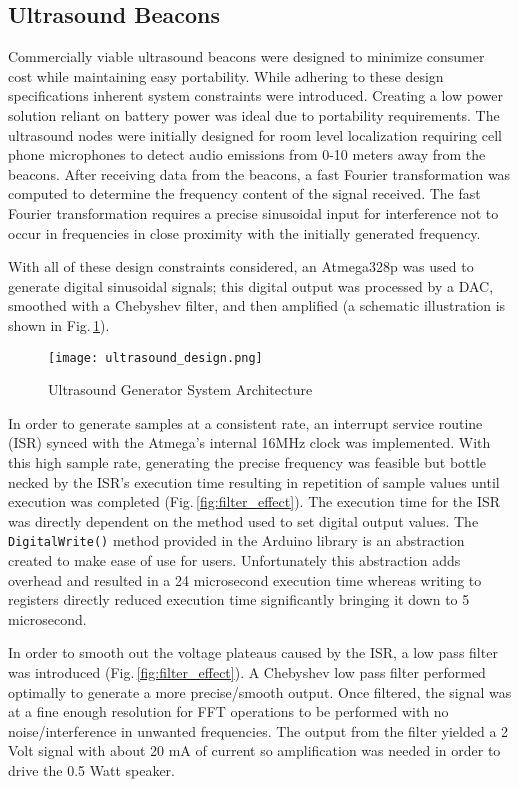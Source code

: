 \subsection{Ultrasound Beacons}
\label{sec:ultrasound-beacons}


Commercially viable ultrasound beacons were designed to minimize consumer cost while maintaining easy portability.  While adhering to these design specifications inherent system constraints were introduced. Creating a low power solution reliant on battery power was ideal due to portability requirements.  The ultrasound nodes were initially designed for room level localization requiring cell phone microphones to detect audio emissions from 0-10 meters away from the beacons. After receiving data from the beacons, a fast Fourier transformation was computed to determine the frequency content of the signal received.  The fast Fourier transformation requires a precise sinusoidal input for interference not to occur in frequencies in close proximity with the initially generated frequency.  

With all of these design constraints considered, an Atmega328p was used to generate digital sinusoidal signals; this digital output was processed by a DAC, smoothed with a Chebyshev filter, and then amplified (a schematic illustration is shown in Fig.\,\ref{fig:ultrasound_design}).
 
\begin{figure}[h]
  \centering
  \texttt{[image: ultrasound\_design.png]}
  \caption{Ultrasound Generator System Architecture}
  \label{fig:ultrasound_design}
\end{figure}

In order to generate samples at a consistent rate, an interrupt service routine (ISR) synced with the Atmega's internal 16MHz clock was implemented. With this high sample rate,  generating the precise frequency was feasible but bottle necked by the ISR's execution time resulting in repetition of sample values until execution was completed (Fig.\,\ref{fig:filter_effect}). The execution time for the ISR was directly dependent on the method used to set digital output values. The {\texttt{DigitalWrite()}} method provided in the Arduino library is an abstraction created to make ease of use for users. Unfortunately this abstraction adds overhead and resulted in a 24 microsecond execution time whereas writing to registers directly reduced execution time significantly bringing it down to 5 microsecond.  

In order to smooth out the voltage plateaus caused by the ISR, a low pass filter was introduced (Fig.\,\ref{fig:filter_effect}). A Chebyshev low pass filter performed optimally to generate a more precise/smooth output. Once filtered, the signal was at a fine enough resolution for FFT operations to be performed with no noise/interference in unwanted frequencies. The output from the filter yielded a 2 Volt signal with about 20 mA of current so amplification was needed in order to drive the 0.5 Watt speaker.

